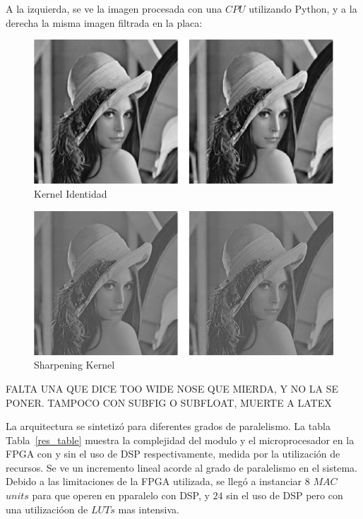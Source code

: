 \documentclass[]{IEEEphot}
\begin{document}
A la izquierda, se ve la imagen procesada con una $CPU$ utilizando Python, y a la derecha
la misma imagen filtrada en la placa:


\begin{figure}[H]
\centering
\includegraphics[scale=0.9]{identity_c}
\caption{Kernel Identidad}
\label{identity}
\end{figure}
\begin{figure}[H]
\centering
\includegraphics[scale=0.9]{shaped_c}
\caption{Sharpening Kernel}
\label{sharp}
\end{figure}

FALTA UNA QUE DICE TOO WIDE NOSE QUE MIERDA, Y NO LA SE PONER. TAMPOCO CON SUBFIG O SUBFLOAT, MUERTE A LATEX
\bigskip
\bigskip
\bigskip
\bigskip
\bigskip
\bigskip
\bigskip
\bigskip
\bigskip
\bigskip
\bigskip
\bigskip
\bigskip
\bigskip
\bigskip
\bigskip
\bigskip
\bigskip
\bigskip





La arquitectura se sintetizó para diferentes grados de paralelismo.
La tabla Tabla~\ref{res_table} muestra la complejidad del modulo y el microprocesador en la FPGA
con y sin el uso de DSP respectivamente, medida por la utilización de recursos.
Se ve un incremento lineal acorde al grado de paralelismo en el sistema. Debido a las limitaciones de la FPGA utilizada,
se llegó a instanciar $8$ $MAC$ $units$ para que operen en pparalelo con DSP, y $24$ sin el uso de DSP pero con
una utilizacióon de $LUTs$ mas intensiva.
\end{document}
